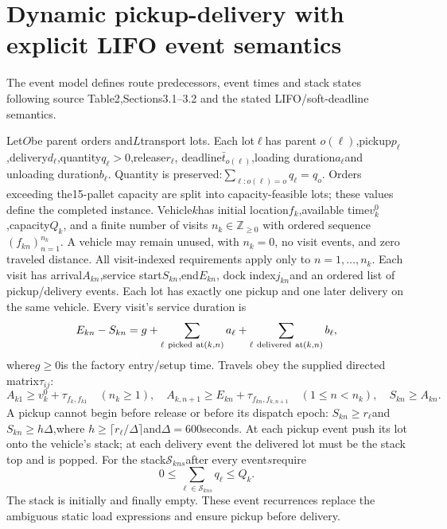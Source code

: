 \documentclass{article}
\begin{document}
\section*{Dynamic pickup-delivery with explicit LIFO event semantics}
The event model defines route predecessors, event times and stack states following source
Table2,Sections3.1--3.2 and the stated LIFO/soft-deadline semantics.


Let$O$be parent orders and$L$transport lots. Each lot$\ell$has parent
$o(\ell)$,pickup$p_\ell$,delivery$d_\ell$,quantity$q_\ell>0$,release$r_\ell$,
deadline$\bar t_{o(\ell)}$,loading duration$a_\ell$and unloading duration$b_\ell$.
Quantity is preserved:$\sum_{\ell:o(\ell)=o}q_\ell=q_o$.
Orders exceeding the15-pallet capacity are split into capacity-feasible lots;
these values define the completed instance.
Vehicle$k$has initial location$f_k$,available time$v_k^0$,capacity$Q_k$,
and a finite number of visits $n_k\in\mathbb Z_{\ge0}$ with ordered sequence
$(f_{kn})_{n=1}^{n_k}$. A vehicle may remain unused, with $n_k=0$,
no visit events, and zero traveled distance. All visit-indexed requirements
apply only to $n=1,\ldots,n_k$.
Each visit has arrival$A_{kn}$,service start$S_{kn}$,end$E_{kn}$,
dock index$j_{kn}$and an ordered list of pickup/delivery events.
Each lot has exactly one pickup and one later delivery on the same vehicle.
Every visit's service duration is
\[
E_{kn}-S_{kn}=g+\sum_{\ell\ {\rm picked\ at}(k,n)}a_\ell
                  +\sum_{\ell\ {\rm delivered\ at}(k,n)}b_\ell,
\]
where$g\ge0$is the factory entry/setup time. Travels obey the supplied
directed matrix$\tau_{ij}$:
\[
A_{k1}\ge v_k^0+\tau_{f_k,f_{k1}}\quad(n_k\ge1),\quad
A_{k,n+1}\ge E_{kn}+\tau_{f_{kn},f_{k,n+1}}\quad(1\le n<n_k),\quad S_{kn}\ge A_{kn}.
\]
A pickup cannot begin before release or before its dispatch epoch:
$S_{kn}\ge r_\ell$and$S_{kn}\ge h\Delta$,where
$h\ge\lceil r_\ell/\Delta\rceil$and$\Delta=600$seconds.
At each pickup event push its lot onto the vehicle's stack; at each delivery
event the delivered lot must be the stack top and is popped.
For the stack$\mathcal S_{kns}$after every event$s$require
\[
0\le\sum_{\ell\in\mathcal S_{kns}}q_\ell\le Q_k.
\]
The stack is initially and finally empty. These event recurrences replace
the ambiguous static load expressions and ensure pickup before delivery.
\end{document}
